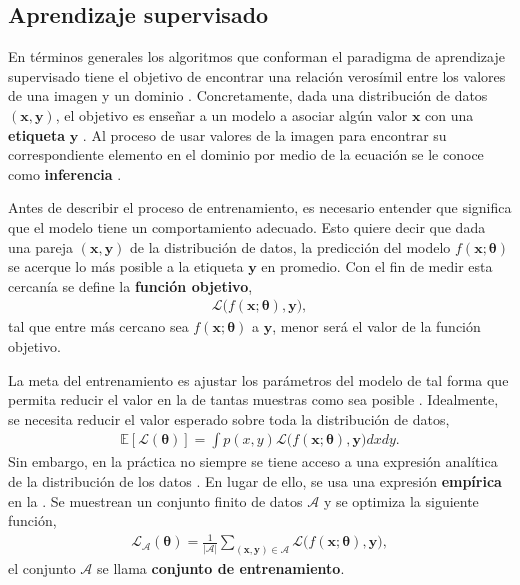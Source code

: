 \subsection{Aprendizaje supervisado}
\label{sec:supervised_learning}
En términos generales los algoritmos que conforman el paradigma de aprendizaje supervisado tiene el objetivo de encontrar una relación verosímil entre los valores de una imagen y un dominio \cite{prince2023understanding}. Concretamente, dada una distribución de datos $(\textbf{x}, \textbf{y})$, el objetivo es enseñar a un modelo a asociar algún valor $\textbf{x}$ con una \textbf{etiqueta} $\textbf{y}$ \cite{Goodfellow-et-al-2016}. Al proceso de usar valores de la imagen para encontrar su correspondiente elemento en el dominio por medio de la ecuación se le conoce como \textbf{inferencia} \cite{prince2023understanding}. 

Antes de describir el proceso de entrenamiento, es necesario entender que significa que el modelo tiene un comportamiento adecuado. Esto quiere decir que dada una pareja $(\mathbf{x}, \mathbf{y})$ de la distribución de datos, la predicción del modelo $f(\mathbf{x}; \bm{\theta})$ se acerque lo más posible a la etiqueta $\mathbf{y}$ en promedio. Con el fin de medir esta cercanía se define la \textbf{función objetivo},
\begin{align}
\mathcal{L}\Big(f(\mathbf{x};\bm\theta), \mathbf{y}\Big),
\label{eq:loss_super}
\end{align}
tal que entre más cercano sea $f(\mathbf{x};\bm\theta)$ a $\mathbf{y}$, menor será el valor de la función objetivo. \cite{Roberts_2022}

La meta del entrenamiento es ajustar los parámetros del modelo de tal forma que permita reducir el valor en la  de tantas muestras como sea posible \cite{Roberts_2022}. Idealmente, se necesita reducir el valor esperado sobre toda la distribución de datos, 
\begin{align}
    \mathbb{E}[\mathcal{L}(\bm\theta)] = \int p(x, y)\mathcal{L}\Big(f(\mathbf{x};\bm\theta), \mathbf{y}\Big) dxdy .
    \label{eq:mean_loss}
\end{align}
Sin embargo, en la práctica no siempre se tiene acceso a una expresión analítica de la distribución de los datos \cite{Roberts_2022}. En lugar de ello, se usa una expresión \textbf{empírica} en la . Se muestrean un conjunto finito de datos $\mathcal{A}$ y se optimiza la siguiente función, 
\begin{align}
    \mathcal{L}_{\mathcal{A}}(\bm\theta) = \frac{1}{|\mathcal{A}|}\sum_{(\mathbf{x}, \mathbf{y}) \in \mathcal{A}} \mathcal{L}\Big(f(\mathbf{x};\bm\theta), \mathbf{y}\Big),
    \label{eq:train_loss}
\end{align}
el conjunto $\mathcal{A}$ se llama \textbf{conjunto de entrenamiento}.

